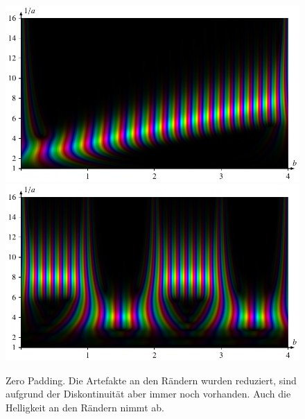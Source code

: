 \begin{figure}
	\centering
	\includegraphics[width=\linewidth, keepaspectratio]{papers/complex/images/padding_zero_sweep.pdf}
	\includegraphics[width=\linewidth, keepaspectratio]{papers/complex/images/padding_zero_square.pdf}
	\caption{Zero Padding. Die Artefakte an den Rändern wurden reduziert, sind aufgrund der Diskontinuität aber immer noch vorhanden. Auch die Helligkeit an den Rändern nimmt ab.}
	\label{complex:padding-zero}
\end{figure}

